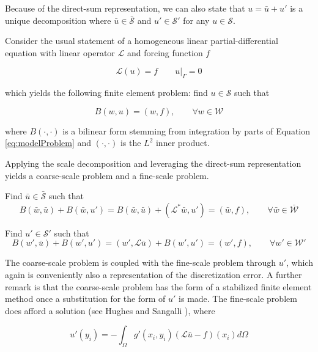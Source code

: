 Because of the direct-sum representation, we can also state that $u=\bar{u}+u'$ is a unique decomposition where $\bar{u} \in \bar{\mathcal{S}}$ and $u' \in \mathcal{S}'$ for any $u \in \mathcal{S}$.

Consider the usual statement of a homogeneous linear partial-differential equation with linear operator $\mathcal{L}$ and forcing function $f$

\begin{equation}
    \mathcal{L}(u) = f \qquad u|_{\Gamma} = 0
    \label{eq:modelProblem}
\end{equation} 

\noindent which yields the following finite element problem:
find $u \in \mathcal{S}$ such that

\begin{equation}
    B(w,u) = (w,f), \qquad \forall w \in \mathcal{W}
\end{equation} 

\noindent where $B(\cdot,\cdot)$ is a bilinear form stemming from integration by parts of Equation \ref{eq:modelProblem} and $(\cdot,\cdot)$ is the $L^2$ inner product.

Applying the scale decomposition and leveraging the direct-sum representation yields a coarse-scale problem and a fine-scale problem.

Find $\bar{u} \in \bar{\mathcal{S}}$ such that
\begin{equation}
    B(\bar{w},\bar{u}) + B(\bar{w},u') = B(\bar{w},\bar{u}) + (\mathcal{L}^{*}\bar{w},u') = (\bar{w},f), \qquad \forall \bar{w} \in \bar{\mathcal{W}}
\end{equation} 

Find $u' \in \mathcal{S}'$ such that
\begin{equation}
    B(w',\bar{u}) + B(w',u') = (w',\mathcal{L}\bar{u}) + B(w',u') = (w',f), \qquad \forall w' \in \mathcal{W}'
    \label{eq:fineScale}
\end{equation}

The coarse-scale problem is coupled with the fine-scale problem through $u'$, which again is conveniently also a representation of the discretization error.
A further remark is that the coarse-scale problem has the form of a stabilized finite element method once a substitution for the form of $u'$ is made.
The fine-scale problem does afford a solution (see Hughes and Sangalli \cite{hughes2007variational}), where

\begin{equation}
    u'(y_i) = -\int_{\Omega} g'(x_i,y_i)(\mathcal{L}\bar{u}-f)(x_i) d\Omega
    \label{eq:uPrimeSoln}
\end{equation} 

